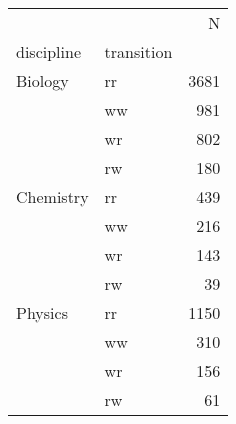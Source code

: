 \begin{tabular}{llr}
\toprule
        &    &     N \\
discipline & transition &       \\
\midrule
Biology & rr &  3681 \\
        & ww &   981 \\
        & wr &   802 \\
        & rw &   180 \\
Chemistry & rr &   439 \\
        & ww &   216 \\
        & wr &   143 \\
        & rw &    39 \\
Physics & rr &  1150 \\
        & ww &   310 \\
        & wr &   156 \\
        & rw &    61 \\
\bottomrule
\end{tabular}
